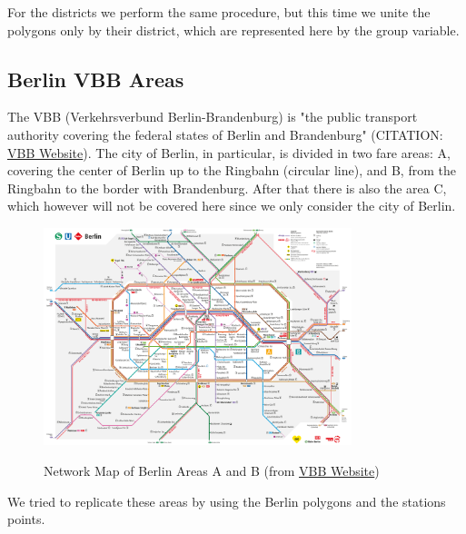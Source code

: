 

For the districts we perform the same procedure, but this time we unite the polygons only by their district, which are represented here by the group variable.

\subsection{Berlin VBB Areas}

The VBB (Verkehrsverbund Berlin-Brandenburg) is "the public transport authority covering the federal states of Berlin and Brandenburg" (CITATION: \href{https://www.vbb.de/en/about-us/the-company-vbb}{VBB Website}). The city of Berlin, in particular, is divided in two fare areas: A, covering the center of Berlin up to the Ringbahn (circular line), and B, from the Ringbahn to the border with Brandenburg. After that there is also the area C, which however will not be covered here since we only consider the city of Berlin.

\begin{figure}[H]
\begin{center}
\includegraphics[width=0.8\textwidth, keepaspectratio]{S_und_U-Bahnnetz_mit_Regionalbahn_Innenstadt.pdf} \\
\caption{Network Map of Berlin Areas A and B (from \href{https://www.vbb.de/en/timetables/network-maps}{VBB Website})}
\end{center}
\end{figure}

We tried to replicate these areas by using the Berlin polygons and the stations points.

